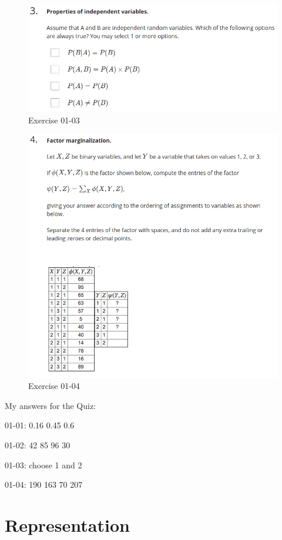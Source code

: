 \documentclass[12pt]{article}
\numberwithin{equation}{section}
\begin{document}
\begin{figure}[H]
  \includegraphics[width=\linewidth]{PGMpics/01-03.png}
  \caption{Exercise 01-03}
  \label{fig:Exercise01-03}
\end{figure}

\begin{figure}[H]
  \includegraphics[width=\linewidth]{PGMpics/01-04.png}
  \caption{Exercise 01-04}
  \label{fig:Exercise01-04}
\end{figure}

My answers for the Quiz:

01-01: 0.16 0.45 0.6

01-02: 42 85 96 30

01-03: choose 1 and 2

01-04: 190 163 70 207

\section{Representation}
\end{document}
